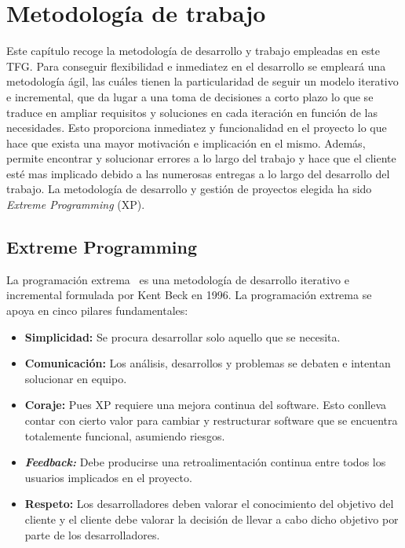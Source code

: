 \chapter{Metodología de trabajo}
\label{cap:Metodologia}
Este capítulo recoge la metodología de desarrollo y trabajo empleadas en este \gls{TFG}. Para conseguir flexibilidad e inmediatez en el desarrollo se empleará una metodología ágil, las cuáles tienen la particularidad de seguir un modelo iterativo e incremental, que da lugar a una toma de decisiones a corto plazo lo que se traduce en ampliar requisitos y soluciones en cada iteración en función de las necesidades. Esto proporciona inmediatez y funcionalidad en el proyecto lo que hace que exista una mayor motivación e implicación en el mismo. Además, permite encontrar y solucionar errores a lo largo del trabajo y hace que el cliente esté mas implicado debido a las numerosas entregas a lo largo del desarrollo del trabajo. La metodología de desarrollo y gestión de proyectos elegida ha sido \textit{Extreme Programming} (\gls{XP}).
\section{Extreme Programming}
La programación extrema~\cite{Newk02} es una metodología de desarrollo iterativo e incremental formulada por Kent Beck en 1996. La programación extrema se apoya en cinco pilares fundamentales:
\begin{itemize}
\item \textbf{Simplicidad:} Se procura desarrollar solo aquello que se necesita.
\item \textbf{Comunicación:} Los análisis, desarrollos y problemas se debaten e intentan solucionar en equipo.
\item \textbf{Coraje:} Pues \gls{XP} requiere una mejora continua del software. Esto conlleva contar con cierto valor para cambiar y restructurar software que se encuentra totalemente funcional, asumiendo riesgos.
\item \textbf{\textit{Feedback:}} Debe producirse una retroalimentación continua entre todos los usuarios implicados en el proyecto.
\item \textbf{Respeto:} Los desarrolladores deben valorar el conocimiento del objetivo del cliente y el cliente debe valorar la decisión de llevar a cabo dicho objetivo por parte de los desarrolladores.
\end{itemize}
